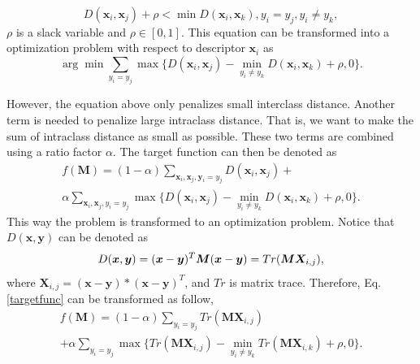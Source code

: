 \documentclass[10pt,twocolumn,letterpaper]{article}
\begin{document}
 \begin{equation}
 D(\bm{x}_i,\bm{x}_j) + \rho < \min D(\bm{x}_i,\bm{x}_k), y_i = y_j, y_i\ne y_k,
 \end{equation}
 $\rho$ is a slack variable and $\rho \in [0,1]$. This equation can be transformed into a optimization problem with respect to descriptor $\bm{x}_i$ as
 \begin{equation}\label{term2}
 \arg \min \sum_{y_i = y_j} \max \{D(\bm{x}_i,\bm{x}_j) -  \min_{ y_i\ne y_k} D(\bm{x}_i,\bm{x}_k)  + \rho, 0 \}.
 \end{equation}
 
 However, the equation above only penalizes small interclass distance. Another term is needed to penalize large intraclass distance. That is, we want to make the sum of intraclass distance as small as possible. These two terms are combined using a ratio factor $\alpha$. The target function can then be denoted as 
 \begin{equation}\label{targetfunc}
 \begin{aligned}
 f(\bm{M}) = (1-\alpha)\sum_{\bm{x}_i,\bm{x}_j,\bm{y}_i=y_j} D(\bm{x}_i,\bm{x}_j) + \\ 
 \alpha \sum_{\bm{x}_i,\bm{x}_j,y_i=y_j}\max\{{D(\bm{x}_i,\bm{x}_j)-\min_{y_i\ne y_k}{D(\bm{x}_i,\bm{x}_k)}+\rho,0}\}.
 \end{aligned}
 \end{equation}
This way the problem is transformed to an optimization problem. Notice that $D(\bm{x},\bm{y})$ can be denoted as 
 \begin{equation}
 D(\bm{x},\bm{y}) = (\bm{x} - \bm{y})^T\bm{M}(\bm{x} - \bm{y})\\ = Tr(\bm{M}\bm{X}_{i,j}),
 \end{equation}
 where $\bm{X}_{i,j} = (\bm{x} - \bm{y})*(\bm{x} - \bm{y})^T$, and $Tr$ is matrix trace. Therefore, Eq. \eqref{targetfunc} can be transformed as follow,
 \begin{equation}\label{targetfinal}
 \begin{aligned}
 f(\bm{M}) = (1-\alpha)\sum_{y_i = y_j}Tr(\bm{M}\bm{X}_{i,j}) \\
  + \alpha \sum_{y_i = y_j}\max\{Tr(\bm{M}\bm{X}_{i,j}) - \min_{y_i\ne y_k} Tr(\bm{M}\bm{X}_{i,k} )+ \rho,0\}.
 \end{aligned}
 \end{equation}
 
\end{document}
